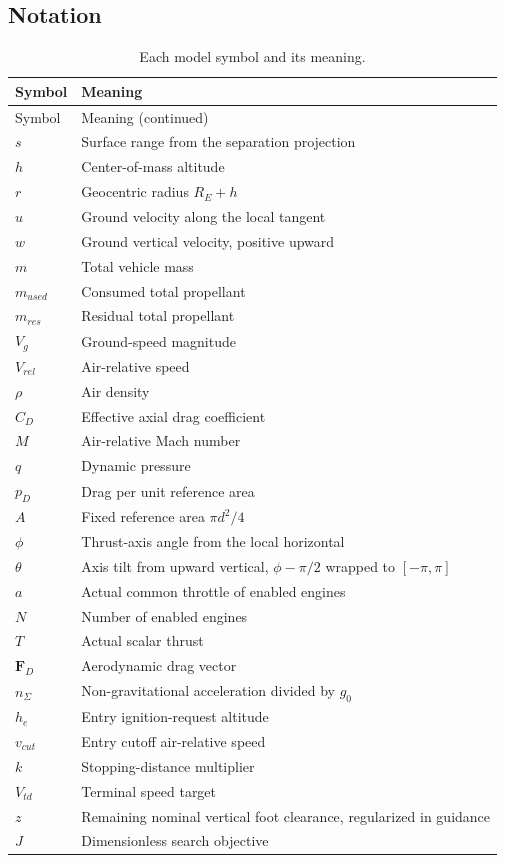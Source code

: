\documentclass[11pt,a4paper]{article}
\newcommand{\vct}[1]{\bm{#1}}
\begin{document}
\subsection{Notation}
\begingroup\small
\begin{longtable}{@{}p{.18\linewidth}p{.76\linewidth}@{}}
\caption{Each model symbol and its meaning.}\\\toprule Symbol & Meaning\\\midrule\endfirsthead
\toprule Symbol & Meaning (continued)\\\midrule\endhead\bottomrule\endfoot
$s$ & Surface range from the separation projection\\
$h$ & Center-of-mass altitude\\
$r$ & Geocentric radius $R_E+h$\\
$u$ & Ground velocity along the local tangent\\
$w$ & Ground vertical velocity, positive upward\\
$m$ & Total vehicle mass\\
$m_{used}$ & Consumed total propellant\\
$m_{res}$ & Residual total propellant\\
$V_g$ & Ground-speed magnitude\\
$V_{rel}$ & Air-relative speed\\
$\rho$ & Air density\\
$C_D$ & Effective axial drag coefficient\\
$M$ & Air-relative Mach number\\
$q$ & Dynamic pressure\\
$p_D$ & Drag per unit reference area\\
$A$ & Fixed reference area $\pi d^2/4$\\
$\phi$ & Thrust-axis angle from the local horizontal\\
$\theta$ & Axis tilt from upward vertical, $\phi-\pi/2$ wrapped to $[-\pi,\pi]$\\
$a$ & Actual common throttle of enabled engines\\
$N$ & Number of enabled engines\\
$T$ & Actual scalar thrust\\
$\vct F_D$ & Aerodynamic drag vector\\
$n_\Sigma$ & Non-gravitational acceleration divided by $g_0$\\
$h_e$ & Entry ignition-request altitude\\
$v_{cut}$ & Entry cutoff air-relative speed\\
$k$ & Stopping-distance multiplier\\
$V_{td}$ & Terminal speed target\\
$z$ & Remaining nominal vertical foot clearance, regularized in guidance\\
$J$ & Dimensionless search objective\\
\end{longtable}\endgroup
\end{document}
